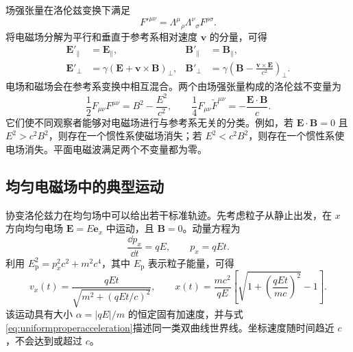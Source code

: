 \documentclass[style=classic,color=full]{lc-article}
\begin{document}
场强张量在洛伦兹变换下满足
\begin{equation}
  F'^{\mu\nu}
  ={\Lambda^\mu}_{\rho}{\Lambda^\nu}_{\sigma}
  F^{\rho\sigma}.
  \label{eq:fieldtransformationtensor}
\end{equation}
将电磁场分解为平行和垂直于参考系相对速度 $\bm v$ 的分量，可得
\begin{equation}
  \begin{aligned}
    \bm E'_{\parallel}&=\bm E_{\parallel},&
    \bm B'_{\parallel}&=\bm B_{\parallel},\\
    \bm E'_{\perp}&=\gamma(\bm E+\bm v\times\bm B)_{\perp},&
    \bm B'_{\perp}&=\gamma\left(
      \bm B-\frac{\bm v\times\bm E}{c^2}
    \right)_{\perp}.
  \end{aligned}
  \label{eq:electromagneticfieldtransformation}
\end{equation}
电场和磁场会在参考系变换中相互混合。两个由场强张量构成的洛伦兹不变量为
\begin{equation}
  \frac{1}{2}F_{\mu\nu}F^{\mu\nu}
  =B^2-\frac{E^2}{c^2},
  \qquad
  \frac{1}{4}F_{\mu\nu}\widetilde F^{\mu\nu}
  =-\frac{\bm E\mathbin{\cdot}\bm B}{c}.
  \label{eq:electromagneticinvariants}
\end{equation}
它们使不同观察者能够对电磁场进行与参考系无关的分类。例如，若 $\bm E\mathbin{\cdot}\bm B=0$ 且 $E^2>c^2B^2$，则存在一个惯性系使磁场消失；若 $E^2<c^2B^2$，则存在一个惯性系使电场消失。平面电磁波满足两个不变量都为零\cite{griffiths,landau}。

\subsection{均匀电磁场中的典型运动}

协变洛伦兹力在均匀场中可以给出若干标准轨迹。先考虑粒子从静止出发，在 $x$ 方向均匀电场 $\bm E=E\bm e_x$ 中运动，且 $\bm B=0$。动量方程为
\begin{equation}
  \frac{\dd p_x}{\dd t}=qE,
  \qquad p_x=qEt.
\end{equation}
利用 $E_{\mathrm p}^2=p_x^2c^2+m^2c^4$，其中 $E_{\mathrm p}$ 表示粒子能量，可得
\begin{equation}
  v_x(t)=\frac{qEt}{
  \sqrt{m^2+(qEt/c)^2}},
  \qquad
  x(t)=\frac{mc^2}{qE}
  \left[
    \sqrt{1+\left(\frac{qEt}{mc}\right)^2}-1
  \right].
  \label{eq:uniformelectricmotion}
\end{equation}
该运动具有大小 $\alpha=\lvert qE\rvert/m$ 的恒定固有加速度，并与式\eqref{eq:uniformproperacceleration}描述同一类双曲线世界线。坐标速度随时间趋近 $c$，不会达到或超过 $c$。
\end{document}
